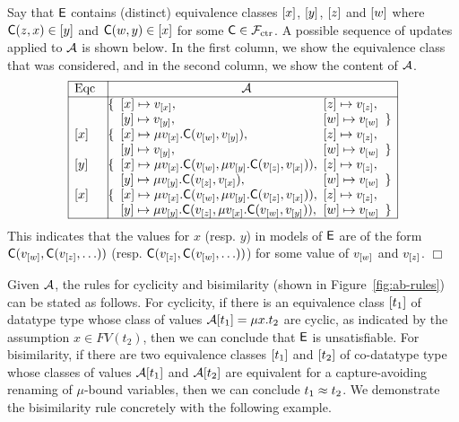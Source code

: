 \begin{example}
Say that $\mathsf{E}$ contains (distinct) equivalence classes $[ x ]$, $[ y ]$, $[ z ]$ and $[ w ]$ 
where $\textsf{C}(z,x) \in [ y ]$ and $\textsf{C}(w,y) \in [ x ]$ for some $\textsf{C} \in \mathcal{F}_{\mathrm{ctr}}$.
A possible sequence of updates applied to $\mathcal{A}$ is shown below.
In the first column, we show the equivalence class that was considered,
and in the second column, we show the content of $\mathcal{A}$.
\[\begin{array}{|l|@{\hspace{.5em}}l@{\hspace{.5em}}l@{\hspace{.5em}}l@{\hspace{.5em}}l|}
\hline
\text{Eqc} & \multicolumn{3}{c}{\Val} & \ 
\\
\hline
& \{ & \ec{x} \mapsto v_{\ec{x}}, & \ec{z} \mapsto v_{\ec{z}}, & \\
&    & \ec{y} \mapsto v_{\ec{y}}, & \ec{w} \mapsto v_{\ec{w}} & \} \\
\ec{x}
& \{ & \ec{x} \mapsto \mu v_{\ec{x}}. \const{C}( v_{\ec{w}}, v_{\ec{y}} ), & \ec{z} \mapsto v_{\ec{z}}, & \\
&    & \ec{y} \mapsto v_{\ec{y}}, & \ec{w} \mapsto v_{\ec{w}} & \} \\
\ec{y}
& \{ & \ec{x} \mapsto \mu v_{\ec{x}}. \const{C}( v_{\ec{w}}, \mu v_{\ec{y}}. \const{C}( v_{\ec{z}}, v_{\ec{x}} ) ), & \ec{z} \mapsto v_{\ec{z}}, & \\
&    & \ec{y} \mapsto \mu v_{\ec{y}}. \const{C}( v_{\ec{z}}, v_{\ec{x}} ), & \ec{w} \mapsto v_{\ec{w}} & \} \\
\ec{x}
& \{ & \ec{x} \mapsto \mu v_{\ec{x}}. \const{C}( v_{\ec{w}}, \mu v_{\ec{y}}. \const{C}( v_{\ec{z}}, v_{\ec{x}} ) ), & \ec{z} \mapsto v_{\ec{z}}, & \\
&    & \ec{y} \mapsto \mu v_{\ec{y}}. \const{C}( v_{\ec{z}}, \mu v_{\ec{x}}. \const{C}( v_{\ec{w}}, v_{\ec{y}} ) ), & \ec{w} \mapsto v_{\ec{w}} & \} \\
\hline
\end{array}\]
This indicates that the values for $x$ (resp. $y$) in models of $\mathsf{E}$
are of the form $\textsf{C}( v_{[ w ]}, \textsf{C}( v_{[ z ]}, \ldots ))$ (resp. $\textsf{C}( v_{[ z ]}, \textsf{C}( v_{[ w ]}, \ldots ))$) 
for some value of $v_{[ w ]}$ and $v_{[ z ]}$.
$\Box$
\end{example}

Given $\mathcal{A}$, the rules for cyclicity and bisimilarity (shown in Figure~\ref{fig:ab-rules}) can be stated as follows.
For cyclicity, if there is an equivalence class $[ t_1 ]$ of datatype type whose class of values $\mathcal{A} [ t_1 ] = \mu x. t_2$ are cyclic,
as indicated by the assumption $x \in FV( t_2 )$,
then we can conclude that $\mathsf{E}$ is unsatisfiable.
For bisimilarity, if there are two equivalence classes $[ t_1 ]$ and $[ t_2 ]$ 
of co-datatype type whose classes of values $\mathcal{A} [ t_1 ]$ and $\mathcal{A} [ t_2 ]$ are equivalent for a capture-avoiding renaming of $\mu$-bound variables,
then we can conclude $t_1 \approx t_2$.
We demonstrate the bisimilarity rule concretely with the following example.

